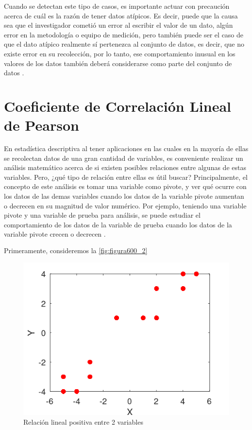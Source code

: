 Cuando se detectan este tipo de casos, es importante actuar con precaución acerca de cuál es la razón de tener datos atípicos. Es decir, puede que la causa sea que el investigador cometió un error al escribir el valor de 
un dato, algún error en la metodología o equipo de medición, pero también puede ser el caso de que el dato atípico realmente sí pertenezca al conjunto de datos, es decir, que no existe error en su recolección, por lo tanto, 
ese comportamiento inusual en los valores de los datos también deberá considerarse como parte del conjunto de datos \cite{anderson}.

\section{Coeficiente de Correlación Lineal de Pearson}

En estadística descriptiva al tener aplicaciones en las cuales en la mayoría de ellas se recolectan datos de una gran cantidad de variables, es conveniente realizar un análisis matemático acerca de si existen posibles 
relaciones entre algunas de estas variables. Pero, ¿qué tipo de relación entre ellas es útil buscar? Principalmente, el concepto de este análisis es tomar una variable como pivote, y ver qué ocurre con los datos de las 
demas variables cuando los datos de la variable pivote aumentan o decrecen en su magnitud de valor numérico. Por ejemplo, teniendo una variable pivote y una variable de prueba para análisis, se puede estudiar el comportamiento
de los datos de la variable de prueba cuando los datos de la variable pivote crecen o decrecen \cite{pinilla_pearson_2021}.

Primeramente, consideremos la \autoref{fig:figura600_2} 

\begin{figure}[h]
	\centering
	\includegraphics[scale=0.7]{imgss141.png}
	\caption{Relación lineal positiva entre 2 variables}
	\label{fig:figura600_2}
\end{figure}

